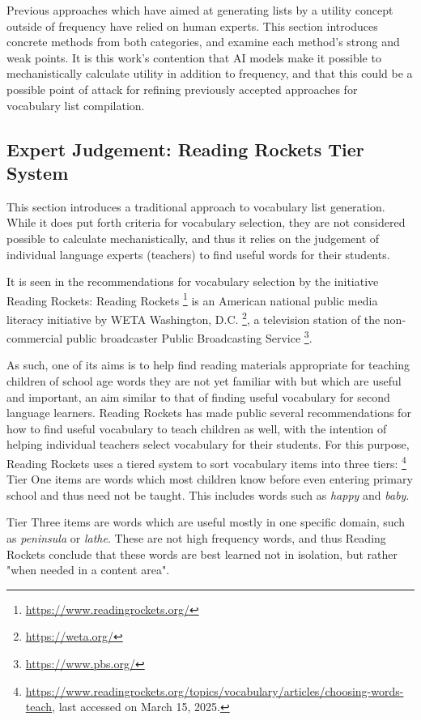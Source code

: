 Previous approaches which have aimed at generating lists by a utility concept outside of frequency have relied on human experts.
This section introduces concrete methods from both categories, and examine each method's strong and weak points.
It is this work's contention that AI models make it possible to mechanistically calculate utility in addition to frequency, and that this could be a possible point of attack for refining previously accepted approaches for vocabulary list compilation.

\subsection{Expert Judgement: Reading Rockets Tier System} \label{sec:reading-rockets}
This section introduces a traditional approach to vocabulary list generation.
While it does put forth criteria for vocabulary selection, they are not considered possible to calculate mechanistically, and thus it relies on the judgement of individual language experts (teachers) to find useful words for their students.

It is seen in the recommendations for vocabulary selection by the initiative Reading Rockets:
Reading Rockets \footnote{\url{https://www.readingrockets.org/}} is an American national public media literacy initiative by WETA Washington, D.C. \footnote{\url{https://weta.org/}}, a television station of the non-commercial public broadcaster Public Broadcasting Service \footnote{\url{https://www.pbs.org/}}.

As such, one of its aims is to help find reading materials appropriate for teaching children of school age words they are not yet familiar with but which are useful and important, an aim similar to that of finding useful vocabulary for second language learners.
Reading Rockets has made public several recommendations for how to find useful vocabulary to teach children as well, with the intention of helping individual teachers select vocabulary for their students.
For this purpose, Reading Rockets uses a tiered system to sort vocabulary items into three tiers:
\footnote{\label{footnote:reading-rockets-choosing-words-to-teach} \url{https://www.readingrockets.org/topics/vocabulary/articles/choosing-words-teach}, last accessed on March 15, 2025.}
Tier One items are words which most children know before even entering primary school and thus need not be taught.
This includes words such as \textit{happy} and \textit{baby}.

Tier Three items are words which are useful mostly in one specific domain, such as \textit{peninsula} or \textit{lathe}.
These are not high frequency words, and thus Reading Rockets conclude that these words are best learned not in isolation, but rather "when needed in a content area".

